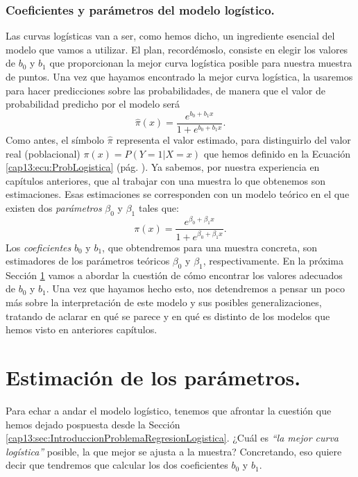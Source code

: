 \subsubsection{Coeficientes y parámetros del modelo logístico.}
\label{cap13:subsubsec:CoeficientesParametrosModeloLogistico}

Las curvas logísticas van a ser, como hemos  dicho, un ingrediente esencial del  modelo que vamos a utilizar. El plan, recordémoslo, consiste en elegir los valores de $b_0$ y $b_1$ que proporcionan la mejor curva logística posible para nuestra muestra de puntos. Una vez que hayamos encontrado la mejor curva logística, la usaremos para hacer predicciones sobre las probabilidades, de manera que el valor de probabilidad predicho por el modelo será
  \begin{equation}\label{cap13:ec:logisticaEstimada}
    \hat{\pi}(x)=\dfrac{e^{b_0+b_1 x}}{1+e^{b_0+b_1 x}}.
  \end{equation}
Como antes,  el símbolo $\hat{\pi}$ representa el valor estimado, para distinguirlo del valor real (poblacional) $\pi(x)=P(Y=1|X=x)$ que hemos definido en la Ecuación \ref{cap13:ecu:ProbLogistica} (pág. \pageref{cap13:ecu:ProbLogistica}). Ya sabemos, por nuestra experiencia en capítulos anteriores, que al trabajar con una muestra lo que obtenemos son estimaciones. Esas estimaciones se corresponden con un modelo teórico en el que existen dos {\em parámetros} $\beta_0$ y $\beta_1$ tales que:
  \begin{equation}\label{cap13:ec:logisticaTeorica}
    \pi(x)=\dfrac{e^{\beta_0+\beta_1 x}}{1+e^{\beta_0+\beta_1 x}}.
  \end{equation}
Los {\em coeficientes} $b_0$ y $b_1$, que obtendremos para una muestra concreta, son estimadores de los parámetros teóricos $\beta_0$ y $\beta_1$, respectivamente.  En la próxima Sección \ref{cap13:sec:EstimacionParametros} vamos a abordar la cuestión de cómo encontrar los valores adecuados de $b_0$ y $b_1$. Una vez que hayamos hecho esto, nos detendremos a pensar un poco más sobre la interpretación de este modelo y sus posibles generalizaciones, tratando de aclarar en qué se parece y en qué es distinto de los modelos que hemos visto en anteriores capítulos.

\section{Estimaci\'on de los parámetros.}
\label{cap13:sec:EstimacionParametros}

Para echar a andar el modelo logístico, tenemos que afrontar la cuestión que hemos dejado pospuesta desde  la Sección \ref{cap13:sec:IntroduccionProblemaRegresionLogistica}. ¿Cuál es {\em ``la mejor curva logística''} posible, la que mejor se ajusta a la muestra? Concretando, eso quiere decir que tendremos que calcular los
dos coeficientes $b_0$ y $b_1$.

